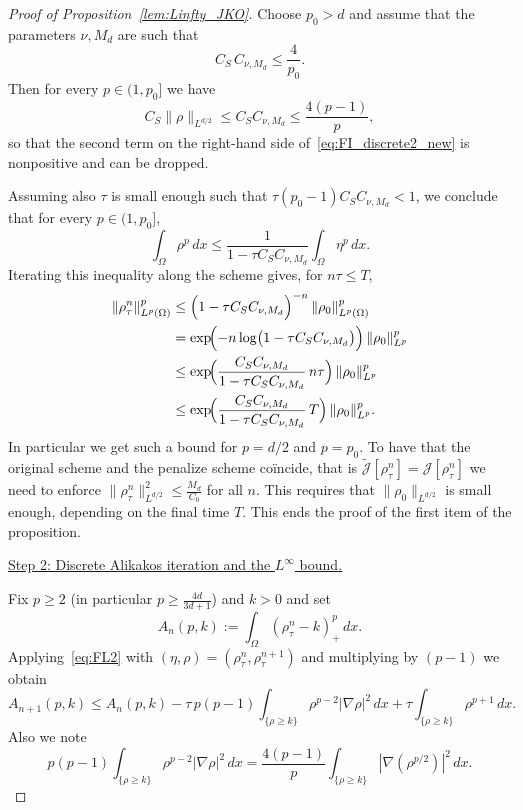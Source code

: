 \documentclass[a4paper,twosided, 11pt]{article}
\theoremstyle{plain}
\theoremstyle{remark}
\numberwithin{equation}{section}
\begin{document}
{\begin{proof}[Proof of Proposition~\ref{lem:Linfty_JKO}]
Choose $p_0>d$ and assume that the parameters $\nu,M_d$ are such that
\begin{equation}\label{eq:smallness_choice_new}
C_S\,C_{\nu,M_d}\le \frac{4}{p_0}.
\end{equation}
Then for every $p\in(1,p_0]$ we have
\[
C_S\|\rho\|_{L^{d/2}}\le C_S C_{\nu,M_d}\le \frac{4(p-1)}{p},
\]
so that the second term on the right-hand side of~\eqref{eq:FI_discrete2_new} is nonpositive and can be dropped.

Assuming also $\tau$ is small enough such that $\tau(p_0-1)C_S C_{\nu,M_d}<1$, we conclude that for every $p\in(1,p_0]$,
\begin{equation*}
\int_\Omega \rho^p\,dx
\le \frac{1}{1-\tau C_S C_{\nu,M_d}}\int_\Omega \eta^p\,dx.
\end{equation*}
Iterating this inequality along the scheme gives, for $n\tau\le T$,
\begin{align*}
\|\rho_\tau^{n}\|_{L^p(\Omega)}^p
&\le \Bigl(1-\tau C_S C_{\nu,M_d}\Bigr)^{-n}\,\|\rho_0\|_{L^p(\Omega)}^p \\
&=\exp\!\Bigl(-n\log\bigl(1-\tau C_S C_{\nu,M_d}\bigr)\Bigr)\,\|\rho_0\|_{L^p}^p \notag\\
&\le \exp\!\Bigl(\frac{C_S C_{\nu,M_d}}{1-\tau C_S C_{\nu,M_d}}\,n\tau\Bigr)\,\|\rho_0\|_{L^p}^p \notag\\
&\le \exp\!\Bigl(\frac{C_S C_{\nu,M_d}}{1-\tau C_S C_{\nu,M_d}}\,T\Bigr)\,\|\rho_0\|_{L^p}^p. \notag
\end{align*}
In particular we get such a bound for $p=d/2$ and $p=p_0$. To have that the original scheme and the penalize scheme coïncide, that is $\widetilde{\mathcal J}[\rho_\tau^{n}] = \mathcal{J}[\rho_\tau^n]$ we need to enforce $\|\rho_\tau^{n}\|_{L^{d/2}}^2\le \frac{M_d}{C_0}$ for all $n$. 
This requires that $\|\rho_0\|_{L^{d/2}}$ is small enough, depending on the final time $T$. This ends the proof of the first item of the proposition.

\medskip

\underline{Step 2: Discrete Alikakos iteration and the $L^\infty$ bound.}

Fix $p\ge 2$ (in particular $p\ge \frac{4d}{3d+1}$) and $k>0$ and set
\[
A_n(p,k):=\int_\Omega (\rho_\tau^{n}-k)_+^p\,dx.
\]
Applying~\eqref{eq:FL2} with $(\eta,\rho)=(\rho_\tau^n,\rho_\tau^{n+1})$ and multiplying by $(p-1)$ we obtain
\begin{equation}\label{eq:FL2_multiplied_new}
A_{n+1}(p,k)
\le A_n(p,k)
-\tau\,p(p-1)\int_{\{\rho\ge k\}}\rho^{p-2}|\nabla\rho|^2\,dx
+\tau\int_{\{\rho\ge k\}}\rho^{p+1}\,dx.
\end{equation}
Also we note
\[
p(p-1)\int_{\{\rho\ge k\}}\rho^{p-2}|\nabla\rho|^2\,dx
=\frac{4(p-1)}{p}\int_{\{\rho\ge k\}}|\nabla(\rho^{p/2})|^2\,dx.
\]


\end{proof}}
\end{document}
